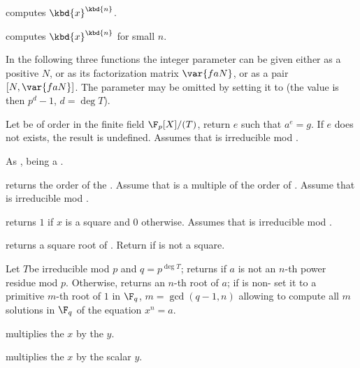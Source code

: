  computes $\kbd{x}^\kbd{n}$.

 computes $\kbd{x}^\kbd{n}$
for small $n$.

In the following three functions the integer parameter  can be given
either as a positive  $N$, or as its factorization matrix $\var{faN}$,
or as a pair $[N,\var{faN}]$. The parameter may be omitted by setting it to
 (the value is then $p^d-1$, $d = \deg T$).

 Let  be of
order  in the finite field $\F_p[X]/(T)$, return $e$ such that
$a^e=g$. If $e$ does not exists, the result is undefined. Assumes
that  is irreducible mod .

 As
,  being a .

 returns the order of the
 . Assume that  is a multiple of the order of
. Assume that  is irreducible mod .

 returns $1$ if $x$ is a square
and $0$ otherwise. Assumes that  is irreducible mod .

 returns a square root of .
Return  if  is not a square.

Let $T$be irreducible mod $p$ and $q = p^{\deg T}$; returns  if $a$
is not an $n$-th power residue mod $p$. Otherwise, returns an $n$-th root of
$a$; if  is non- set it to a primitive $m$-th root of $1$
in $\F_q$, $m = \gcd(q-1,n)$ allowing to compute all $m$ solutions in $\F_q$
of the equation $x^n = a$.





 multiplies the  $x$
by the  $y$.

 multiplies the  $x$
by the scalar $y$.

